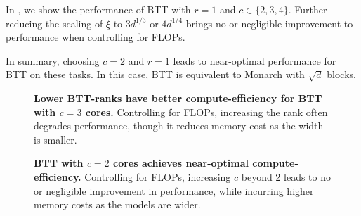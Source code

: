 \documentclass{article}
\theoremstyle{plain}
\theoremstyle{definition}
\theoremstyle{remark}
\begin{document}
In , we show the performance of BTT with $r=1$ and $c \in \{2, 3, 4\}.$ Further reducing the scaling of $\xi$ to $3d^{1/3}$ or $4d^{1/4}$ brings no or negligible improvement to performance when controlling for FLOPs.

In summary, choosing $c=2$ and $r=1$ leads to near-optimal performance for BTT on these tasks. In this case, BTT is equivalent to Monarch with $\sqrt{d}$ blocks.

\begin{figure}[!h]
\centering
   \caption{ \textbf{Lower BTT-ranks have better compute-efficiency for BTT with $c=3$ cores.} Controlling for FLOPs, increasing the rank often degrades performance, though it reduces memory cost as the width is smaller.
   }
    \label{fig:3-core-rank}
    \vspace{-4mm}
\end{figure}


\begin{figure}[!h]
\centering
   \caption{ \textbf{BTT with $c=2$ cores achieves near-optimal compute-efficiency.} Controlling for FLOPs, increasing $c$ beyond 2 leads to no or negligible improvement in performance, while incurring higher memory costs as the models are wider.
   }
    \label{fig:more-cores}
    \vspace{-4mm}
\end{figure}
\end{document}
